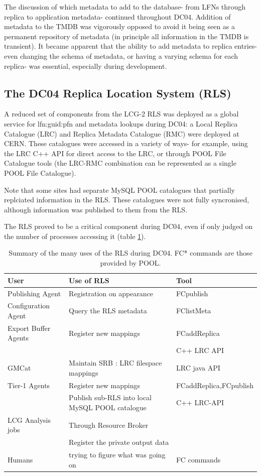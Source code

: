 \documentclass{cmspaper}
\begin{document}
The discussion of which metadata to add to the database- from LFNs through replica to application metadata- continued throughout DC04. Addition of metadata to the TMDB was vigorously opposed to avoid it being seen as a permanent repository of metadata (in principle all information in the TMDB is transient). It became apparent that the ability to add metadata to replica entries- even changing the schema of metadata, or having a varying schema for each replica- was essential, especially during development.

\subsection{The DC04 Replica Location System (RLS)}
A reduced set of components from the LCG-2 RLS was deployed as a global service for lfn:guid:pfn and metadata lookups during DC04: a Local Replica Catalogue (LRC) and Replica Metadata Catalogue (RMC) were deployed at CERN. These catalogues were accessed in a variety of ways- for example, using the LRC C++ API for direct access to the LRC, or through POOL File Catalogue tools (the LRC-RMC combination can be represented as a single POOL File Catalogue).

Note that some sites had separate MySQL POOL catalogues that partially replciated information in the RLS. These catalogues were not fully syncronised, although information was published to them from the RLS.

The RLS proved to be a critical component during DC04, even if only judged on the number of processes accessing it (table \ref{table:rls}).

\begin{table}
\begin{tabular}[tbp]{|l|l|l|}
\hline User & Use of RLS & Tool
\\ \hline Publishing Agent & Registration on appearance & FCpublish
\\ Configuration Agent & Query the RLS metadata & FClistMeta
\\ Export Buffer Agents & Register new mappings & FCaddReplica
\\ & & C++ LRC API
\\ GMCat & Maintain SRB : LRC filespace mappings & LRC java API
\\ Tier-1 Agents & Register new mappings & FCaddReplica,FCpublish
\\ & Publish sub-RLS into local MySQL POOL catalogue & C++ LRC-API
\\ LCG Analysis jobs & Through Resource Broker &
\\ & Register the private output data & 
\\ Humans & trying to figure what was going on & FC commands
\\ \hline
\end{tabular}
\label{table:rls}
\caption{Summary of the many uses of the RLS during DC04. FC* commands are those provided by POOL.}
\end{table}
\end{document}
